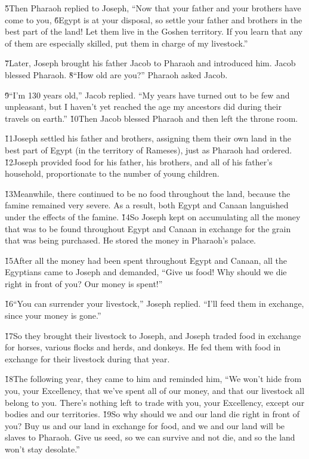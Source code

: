 \v{5}Then Pharaoh replied to Joseph, ``Now that your father and your brothers have come to you, \v{6}Egypt is at your disposal, so settle your father and brothers in the best part of the land! Let them live in the Goshen territory. If you learn that any of them are especially skilled, put them in charge of my livestock.''

\v{7}Later, Joseph brought his father Jacob to Pharaoh and introduced him. Jacob blessed Pharaoh. \v{8}``How old are you?'' Pharaoh asked Jacob.

\v{9}``I'm 130 years old,'' Jacob replied. ``My years have turned out to be few and unpleasant, but I haven't yet reached the age my ancestors did during their travels on earth.'' \v{10}Then Jacob blessed Pharaoh and then left the throne room.

\v{11}Joseph settled his father and brothers, assigning them their own land in the best part of Egypt (in the territory of Rameses), just as Pharaoh had ordered. \v{12}Joseph provided food for his father, his brothers, and all of his father's household, proportionate to the number of young children.

\v{13}Meanwhile, there continued to be no food throughout the land, because the famine remained very severe. As a result, both Egypt and Canaan languished under the effects of the famine. \v{14}So Joseph kept on accumulating all the money that was to be found throughout Egypt and Canaan in exchange for the grain that was being purchased. He stored the money in Pharaoh's palace.

\v{15}After all the money had been spent throughout Egypt and Canaan, all the Egyptians came to Joseph and demanded, ``Give us food! Why should we die right in front of you? Our money is spent!''

\v{16}``You can surrender your livestock,'' Joseph replied. ``I'll feed them in exchange, since your money is gone.''

\v{17}So they brought their livestock to Joseph, and Joseph traded food in exchange for horses, various flocks and herds, and donkeys. He fed them with food in exchange for their livestock during that year.

\v{18}The following year, they came to him and reminded him, ``We won't hide from you, your Excellency, that we've spent all of our money, and that our livestock all belong to you. There's nothing left to trade with you, your Excellency, except our bodies and our territories. \v{19}So why should we and our land die right in front of you? Buy us and our land in exchange for food, and we and our land will be slaves to Pharaoh. Give us seed, so we can survive and not die, and so the land won't stay desolate.''

